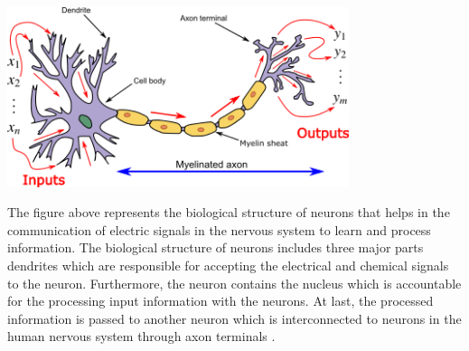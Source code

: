 \vspace{3mm}
\begin{center}
\includegraphics[width=10cm]{Images/neuron.png}
\end{center}

The figure above represents the biological structure of neurons that helps in the communication of electric signals in the nervous system to learn and process information. The biological structure of neurons
includes three major parts dendrites which are responsible for accepting the electrical and chemical signals to the neuron. 
Furthermore, the neuron contains the nucleus which is accountable for the processing input information with the neurons. 
At last, the processed information is passed to another neuron which is interconnected to neurons in the human nervous system through axon terminals
\citep{AGATONOVICKUSTRIN2000717}. 
